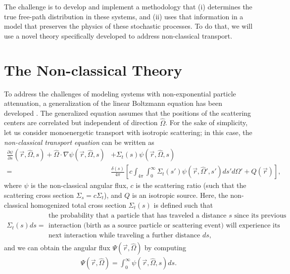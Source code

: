 \documentclass[12pt]{article}
\newcommand{\rvec}{\ensuremath{\vec{r}}}
\newcommand{\omvec}{\ensuremath{\hat{\Omega}}}
\begin{document}
The challenge is to develop and implement a methodology that (i) determines the true free-path distribution in these systems, and (ii) uses that information in a model that preserves the physics of these stochastic processes.
To do that, we will use a novel theory specifically developed to address non-classical transport.

\section{The Non-classical Theory}

To address the challenges of modeling systems with non-exponential particle attenuation, a generalization of the linear Boltzmann equation has been developed \cite{larvas11,davxu14,vaslar14a,xudav16}.
The generalized equation assumes that the positions of the scattering centers are correlated but independent of direction $\omvec$.
For the sake of simplicity, let us consider monoenergetic transport with isotropic scattering; in this case, the \textit{non-classical transport equation} can be written as
\begin{align}
\frac{\partial \psi}{\partial s}(\rvec,\omvec,s) + \omvec\cdot\nabla\psi(\rvec,\omvec,s) &+ \Sigma_t(s)\psi(\rvec,\omvec,s)\label{eq2} \\
=
&\frac{\delta(s)}{4\pi}\left[c\int_{4\pi}\int_0^\infty \Sigma_t(s')\psi(\rvec,\omvec',s')ds'd\Omega' + Q(\rvec)\right],\nonumber
\end{align}
where $\psi$ is the non-classical angular flux, $c$ is the scattering ratio (such that the scattering cross section $\Sigma_s = c\Sigma_t$), and $Q$ is an isotropic source.
Here, the non-classical homogenized total cross section $\Sigma_t(s)$ is defined such that
\begin{align*}
\Sigma_t(s)ds =
\begin{array}{l}
\text{the probability that a particle that has traveled
a distance $s$ since its previous}\\
\text{interaction (birth as a source particle or scattering event) will experience its}\\
\text{next interaction while
traveling a further distance $ds$,}
\end{array}
\end{align*}
and we can obtain the angular flux $\Psi(\rvec,\omvec)$ by computing
\begin{align}
\Psi(\rvec,\omvec) = \int_0^\infty \psi(\rvec,\omvec,s)ds.
\end{align}
\end{document}
